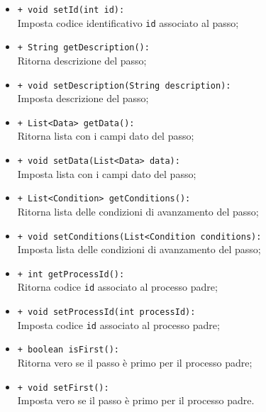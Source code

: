 \begin{flushleft}
\begin{itemize}
\begin{sloppypar}
\begin{itemize}
\item \texttt{+ void setId(int id):}\\ Imposta codice identificativo \texttt{id} associato al passo;
\item \texttt{+ String getDescription():}\\ Ritorna descrizione del passo;
\item \texttt{+ void setDescription(String description):}\\ Imposta descrizione del passo;
\item \texttt{+ List<Data> getData():}\\ Ritorna lista con i campi dato del passo;
\item \texttt{+ void setData(List<Data> data):}\\ Imposta lista con i campi dato del passo;
\item \texttt{+ List<Condition> getConditions():}\\ Ritorna lista delle condizioni di avanzamento del passo;
\item \texttt{+ void setConditions(List<Condition conditions):}\\ Imposta lista delle condizioni di avanzamento del passo;
\item \texttt{+ int getProcessId():}\\ Ritorna codice \texttt{id} associato al processo padre;
\item \texttt{+ void setProcessId(int processId):}\\ Imposta codice \texttt{id} associato al processo padre;
\item \texttt{+ boolean isFirst():}\\ Ritorna vero se il passo è primo per il processo padre;
\item \texttt{+ void setFirst():}\\ Imposta vero se il passo è primo per il processo padre. 
\end{itemize}
\end{sloppypar}
\end{itemize}
\end{flushleft}

